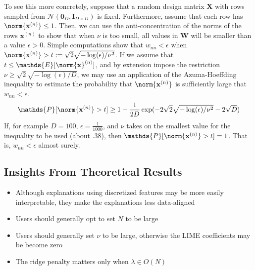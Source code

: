 \documentclass[mnsc,blindrev]{informs3}
\newcommand{\bx}{\mathbf{x}}
\newcommand{\bX}{\mathbf{X}}
\newcommand{\bI}{\mathbf{I}}
\newcommand{\bW}{\mathbf{W}}
\begin{document}
                To see this more concretely, suppose that a random design matrix $\bX$ with rows sampled from $\mathcal{N}(\mathbf{0}_{D}, \bI_{D\times D})$ is fixed. Furthermore, assume that each row has $\norm{\bx^{(n)}} \leq 1$. Then, we can use the anti-concentration of the norms of the rows $\bx^{(n)}$ to show that when $\nu$ is too small, all values in $\bW$ will be smaller than a value $\epsilon > 0$. Simple computations show that $w_{nn} < \epsilon$ when $\norm{\bx^{(n)}} > t:= \sqrt{2}\sqrt{-\log(\epsilon)/\nu^2}$. If we assume that $t\leq \mathds{E}[\norm{\bx}^{(n)}]$, and by extension impose the restriction $\nu \geq \sqrt{2}\sqrt{-\log(\epsilon)/D}$, we may use an application of the Azuma-Hoeffding inequality \citep{hoeffding1994probability} to estimate the probability that $\norm{\bx^{(n)}}$ is sufficiently large that $w_{nn} < \epsilon$. 
                \begin{equation*}
                    \mathds{P}[\norm{\bx^{(n)}} > t] \geq 1 - \frac{1}{2D}\exp(-2\sqrt{2}\sqrt{-\log(\epsilon)/\nu^2}-2\sqrt{D})
                \end{equation*}
                If, for example $D=100$, $\epsilon=\frac{1}{1000}$, and $\nu$ takes on the smallest value for the inequality to be used (about $.38$), then $\mathds{P}[\norm{\bx^{(n)}} > t]=1$. That is, $w_{nn}<\epsilon$  almost surely.


            
        \subsection*{Insights From Theoretical Results}
            \begin{itemize}
                \item Although explanations using discretized features may be more easily interpretable, they make the explanations less data-aligned
                \item Users should generally opt to set $N$ to be large 
                \item Users should generally set $\nu$ to be large, otherwise the LIME coefficients may be become zero
                \item The ridge penalty matters only when $\lambda \in O(N)$
            \end{itemize}
    
\end{document}
